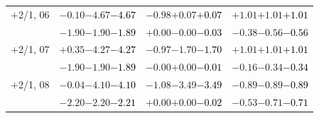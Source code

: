 \documentclass[compress]{beamer}
\begin{document}
\begin{frame}
\begin{tabular}{r | c | c | c}
$+$2/1, 06 & $-0.10$\hspace{0.1 cm}$-4.67$\hspace{0.1 cm}\textcolor{black}{$-4.67$} & $-0.98$\hspace{0.1 cm}$+0.07$\hspace{0.1 cm}\textcolor{black}{$+0.07$} & $+1.01$\hspace{0.1 cm}$+1.01$\hspace{0.1 cm}\textcolor{black}{$+1.01$} \\
           & $-1.90$\hspace{0.1 cm}$-1.90$\hspace{0.1 cm}\textcolor{black}{$-1.89$} & $+0.00$\hspace{0.1 cm}$-0.00$\hspace{0.1 cm}\textcolor{black}{$-0.03$} & $-0.38$\hspace{0.1 cm}$-0.56$\hspace{0.1 cm}\textcolor{black}{$-0.56$} \\
$+$2/1, 07 & $+0.35$\hspace{0.1 cm}$-4.27$\hspace{0.1 cm}\textcolor{black}{$-4.27$} & $-0.97$\hspace{0.1 cm}$-1.70$\hspace{0.1 cm}\textcolor{black}{$-1.70$} & $+1.01$\hspace{0.1 cm}$+1.01$\hspace{0.1 cm}\textcolor{black}{$+1.01$} \\
           & $-1.90$\hspace{0.1 cm}$-1.90$\hspace{0.1 cm}\textcolor{black}{$-1.89$} & $-0.00$\hspace{0.1 cm}$+0.00$\hspace{0.1 cm}\textcolor{black}{$-0.01$} & $-0.16$\hspace{0.1 cm}$-0.34$\hspace{0.1 cm}\textcolor{black}{$-0.34$} \\
$+$2/1, 08 & $-0.04$\hspace{0.1 cm}$-4.10$\hspace{0.1 cm}\textcolor{black}{$-4.10$} & $-1.08$\hspace{0.1 cm}$-3.49$\hspace{0.1 cm}\textcolor{black}{$-3.49$} & $-0.89$\hspace{0.1 cm}$-0.89$\hspace{0.1 cm}\textcolor{black}{$-0.89$} \\
           & $-2.20$\hspace{0.1 cm}$-2.20$\hspace{0.1 cm}\textcolor{black}{$-2.21$} & $+0.00$\hspace{0.1 cm}$+0.00$\hspace{0.1 cm}\textcolor{black}{$-0.02$} & $-0.53$\hspace{0.1 cm}$-0.71$\hspace{0.1 cm}\textcolor{black}{$-0.71$} \\

\end{tabular}
\end{frame}
\end{document}
